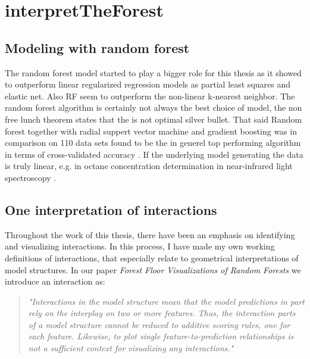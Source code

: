 \chapter{interpretTheForest}

\section{Modeling with random forest}
The random forest model started to play a bigger role for this thesis as it showed to outperform linear regularized regression models as partial least squares and elastic net. Also RF seem to outperform the non-linear k-nearest neighbor. The random forest algorithm is certainly not always the best choice of model, the non free lunch theorem states that the is not optimal silver bullet. That said Random forest together with radial suppert vector machine and gradient boosting was in comparison on 110 data sets found to be the in generel top performing algorithm in terms of cross-validated accuracy \cite{Citewainer2016comparison}. If the underlying model generating the data is truly linear, e.g. in octane concentration determination in near-infrared light spectroscopy \cite{kalivas1997two}.


\section{One interpretation of interactions}
Throughout the work of this thesis, there have been an emphasis on identifying and visualizing interactions. In this process, I have made my own working definitions of interactions, that especially relate to geometrical interpretations of model structures. In our paper \textit{Forest Floor Visualizations of Random Forests} we introduce an interaction as:

\begin{quotation}
\textit{
"Interactions in the model structure mean that the model predictions in part rely on the interplay on two or more features. Thus, the interaction parts of a model structure cannot be reduced to additive scoring rules, one for each feature. Likewise, to plot single feature-to-prediction relationships is not a sufficient context for visualizing any interactions."
}
\cite{welling2016forest}
\end{quotation}

